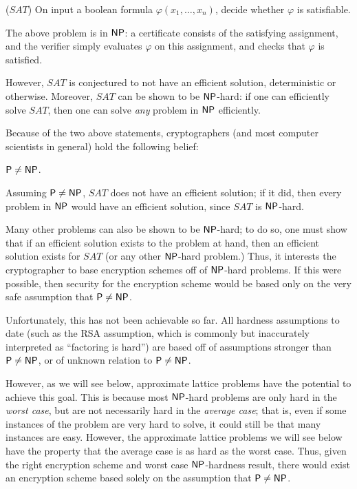     \begin{definition} ($\textit{SAT}$)
        On input a boolean formula $\varphi(x_1, \dots, x_n)$, decide whether $\varphi$ is satisfiable.
    \end{definition}

    The above problem is in ${\sf NP}$: a certificate consists of the satisfying assignment, and the verifier simply evaluates $\varphi$ on this assignment, and checks that $\varphi$ is satisfied.

    However, $\textit{SAT}$ is conjectured to not have an efficient solution, deterministic or otherwise. Moreover, $\textit{SAT}$ can be shown to be ${\sf NP}$-hard: if one can efficiently solve $\textit{SAT}$, then one can solve \emph{any} problem in ${\sf NP}$ efficiently.

    Because of the two above statements, cryptographers (and most computer scientists in general) hold the following belief:
    \begin{conjecture}
        ${\sf P} \neq {\sf NP}$.
    \end{conjecture}

    Assuming ${\sf P} \neq {\sf NP}$, $\textit{SAT}$ does not have an efficient solution; if it did, then every problem in ${\sf NP}$ would have an efficient solution, since $\textit{SAT}$ is ${\sf NP}$-hard.

    Many other problems can also be shown to be ${\sf NP}$-hard; to do so, one must show that if an efficient solution exists to the problem at hand, then an efficient solution exists for $\textit{SAT}$ (or any other ${\sf NP}$-hard problem.) Thus, it interests the cryptographer to base encryption schemes off of ${\sf NP}$-hard problems. If this were possible, then security for the encryption scheme would be based only on the very safe assumption that ${\sf P} \neq {\sf NP}$.

    Unfortunately, this has not been achievable so far. All hardness assumptions to date (such as the RSA assumption, which is commonly but inaccurately interpreted as ``factoring is hard'') are based off of assumptions stronger than ${\sf P} \neq {\sf NP}$, or of unknown relation to ${\sf P} \neq {\sf NP}$.

    However, as we will see below, approximate lattice problems have the potential to achieve this goal. This is because most ${\sf NP}$-hard problems are only hard in the \emph{worst case}, but are not necessarily hard in the \emph{average case}; that is, even if some instances of the problem are very hard to solve, it could still be that many instances are easy. However, the approximate lattice problems we will see below have the property that the average case is as hard as the worst case. Thus, given the right encryption scheme and worst case ${\sf NP}$-hardness result, there would exist an encryption scheme based solely on the assumption that ${\sf P} \neq {\sf NP}$.


